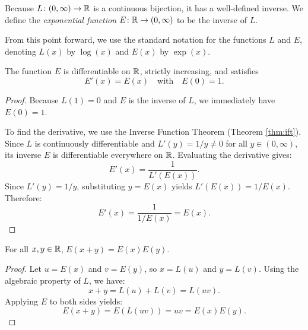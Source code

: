 \documentclass[../analysis1.tex]{subfiles}
\begin{document}
\begin{definition}
    \begin{shaded*}
        Because $L \colon (0, \infty) \to \mathbb{R}$ is a continuous bijection, it has a well-defined inverse. We define the \textit{exponential function} $E \colon \mathbb{R} \to (0, \infty)$ to be the inverse of $L$. 
    \end{shaded*}
\end{definition}

\begin{remark}
    From this point forward, we use the standard notation for the functions $L$ and $E$, denoting $L(x)$ by $\log(x)$ and $E(x)$ by $\exp(x)$.
\end{remark}

\begin{theorem}
    \begin{shaded*}
        The function $E$ is differentiable on $\mathbb{R}$, strictly increasing, and satisfies
        \[
            E'(x) = E(x) \quad \text{with} \quad E(0) = 1.
        \]
    \end{shaded*}
\end{theorem}

\begin{proof}
    Because $L(1) = 0$ and $E$ is the inverse of $L$, we immediately have $E(0) = 1$.
    
    To find the derivative, we use the Inverse Function Theorem (Theorem \ref{thm:ift}). Since $L$ is continuously differentiable and $L'(y) = 1/y \neq 0$ for all $y \in (0, \infty)$, its inverse $E$ is differentiable everywhere on $\mathbb{R}$. Evaluating the derivative gives:
    \[
        E'(x) = \frac{1}{L'(E(x))}.
    \]
    Since $L'(y) = 1/y$, substituting $y = E(x)$ yields $L'(E(x)) = 1/E(x)$. Therefore:
    \[
        E'(x) = \frac{1}{1/E(x)} = E(x).
    \]\qedhere
\end{proof}

\begin{theorem}
    \begin{shaded*}
        For all $x, y \in \mathbb{R}$, $E(x + y) = E(x)E(y)$.
    \end{shaded*}
\end{theorem}

\begin{proof}
    Let $u = E(x)$ and $v = E(y)$, so $x = L(u)$ and $y = L(v)$. 
    Using the algebraic property of $L$, we have:
    \[
        x + y = L(u) + L(v) = L(uv).
    \]
    Applying $E$ to both sides yields:
    \[
        E(x + y) = E(L(uv)) = uv = E(x)E(y).
    \]
\end{proof}
\end{document}
